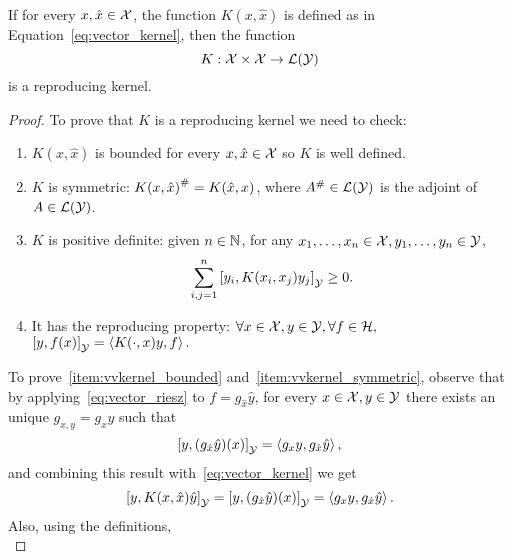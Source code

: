 \begin{proposition}
    If for every $x, \hat{x} \in \mathcal{X}$, the function $K(x, \hat{x})$ is defined as in Equation~\eqref{eq:vector_kernel}, then the function
    \begin{equation}
        \nonumber
        K: \mathcal{X} \times \mathcal{X} \to \mathcal{L}(\mathcal{Y})
    \end{equation}
    is a reproducing kernel.
\end{proposition}
\begin{proof}
    To prove that $K$ is a reproducing kernel we need to check: 
    \begin{enumerate}
        \item\label{item:vvkernel_bounded} $K(x, \hat{x})$ is bounded for every $x, \hat{x} \in \mathcal{X}$ so $K$ is well defined.
        \item\label{item:vvkernel_symmetric} $K$ is symmetric: ${K(x, \hat{x})}^{\#} = K(\hat{x}, x)$, where ${A}^{\#} \in \mathcal{L}(\mathcal{Y})$ is the adjoint of $A \in \mathcal{L}(\mathcal{Y})$.
        \item\label{item:vvkernel_positive}  $K$ is positive definite: given $n \in \mathbb{N}$, for any  $x_1, \ldots, x_n \in \mathcal{X},  y_1, \ldots, y_n \in \mathcal{Y}$,
        \begin{equation}
            \nonumber
            \sum_{i, j =1}^n \left[ y_i, K(x_i, x_j) y_j \right]_\mathcal{Y} \geq 0.
        \end{equation}
        \item\label{item:vvkernel_repr} It has the reproducing property: $\forall x \in \mathcal{X}, y \in \mathcal{Y}, \forall f \in \mathcal{H},$ $ \left[ y, f(x) \right]_\mathcal{Y} = \left\langle K(\cdot, x) y, f \right\rangle.$
    \end{enumerate}
    To prove~\ref{item:vvkernel_bounded} and~\ref{item:vvkernel_symmetric}, observe that by
    applying~\eqref{eq:vector_riesz} to $f = g_{\hat{x}}\hat{y}$, for every $x \in \mathcal{X}, y \in \mathcal{Y}$ there exists an unique $g_{x, y} = g_{x}y$ such that
    \begin{equation}
        \left[ y, (g_{\hat{x}} \hat{y}) (x) \right]_\mathcal{Y} = \left\langle g_{x}y, g_{\hat{x}}\hat{y} \right\rangle ,
    \end{equation}
    and combining this result with~\eqref{eq:vector_kernel} we get
    \begin{equation}
        \nonumber
        \left[ y, K(x, \hat{x}) \hat{y} \right]_\mathcal{Y} = \left[ y, (g_{\hat{x}} \hat{y})(x)  \right]_\mathcal{Y}= \left\langle g_{x}y, g_{\hat{x}}\hat{y} \right\rangle.
    \end{equation}
    Also, using the definitions,
    \begin{equation}

\end{equation}
\end{proof}
